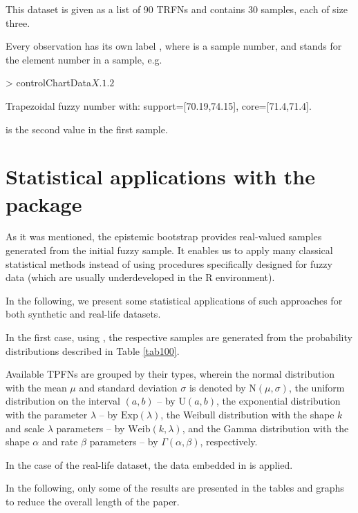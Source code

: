 This dataset is given as a list of 90 TRFNs and contains 30 samples, each of size three.

Every observation has its own label , where  is a sample number, and  stands for the element number in a sample, e.g.

\begin{example}
> controlChartData$X.1.2$

Trapezoidal fuzzy number with:
   support=[70.19,74.15],
   core=[71.4,71.4].
\end{example}

is the second value in the first sample.


\section{Statistical applications with the package}

As it was mentioned, the epistemic bootstrap provides real-valued samples generated from the initial fuzzy sample. It enables us to apply many classical statistical methods instead of using procedures specifically designed for fuzzy data (which are usually underdeveloped in the R environment).

In the following, we present some statistical applications of such approaches for both synthetic and real-life datasets.

In the first case, using , the respective samples are generated from the probability distributions described in Table \ref{tab100}.

Available TPFNs are grouped by their types, wherein the normal distribution with the mean $\mu$ and standard deviation $\sigma$ is denoted by $\mathrm{N}(\mu,\sigma)$, the uniform distribution on the interval $(a,b)$ -- by $\mathrm{U}(a,b)$, the exponential distribution with the parameter $\lambda$ -- by $\mathrm{Exp}(\lambda)$, the Weibull distribution with the shape $k$ and scale $\lambda$ parameters -- by $\mathrm{Weib} (k,\lambda)$, and the Gamma distribution with the shape $\alpha$ and rate $\beta$ parameters  -- by $\Gamma (\alpha,\beta)$, respectively.

In the case of the real-life dataset, the data  embedded in  is applied.

In the following, only some of the results are presented in the tables and graphs to reduce the overall length of the paper.


